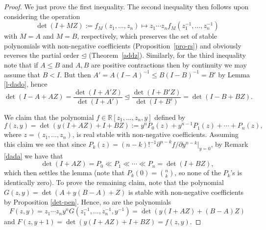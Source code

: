 \documentclass[10pt,reqno]{amsart}
\theoremstyle{plain}
\newtheorem{lemma}[theorem]{Lemma}
\theoremstyle{definition}
\theoremstyle{remark}
\newcommand{\RR}{\mathbb{R}}
\begin{document}
\begin{proof}
We just prove the first inequality. The second inequality then follows upon 
considering the operation 
$$\det(I+MZ):=f_M(z_1, \ldots, z_n) \mapsto 
z_1\cdots z_nf_M(z_1^{-1},\ldots, z_n^{-1})$$  
with $M=A$ and $M=B$, respectively, which preserves the set of stable 
polynomials with non-negative coefficients 
(Proposition~\ref{pro-rs}) and obviously reverses the partial order $\unlhd$
(Theorem~\ref{addz}).
Similarly, for the third inequality note that if $A \leq B$ and $A,B$ are 
positive contractions then 
by continuity we may assume that $B<I$. But then  
$A'=A(I-A)^{-1} \leq B(I-B)^{-1}=B'$ by Lemma \ref{l-dado}, hence
$$
\det(I-A+AZ)= \frac {\det(I+A'Z)}{\det(I+A')} \unlhd 
\frac{\det(I+B'Z)}{\det(I+B')}=\det(I-B+BZ). 
$$

We claim that the polynomial  $f \in \RR[z_1,\ldots, z_n,y]$ defined by 
$$f(z,y)=\det(y(I+AZ)+I+BZ):=y^nP_0(z)+ y^{n-1}P_1(z)+\cdots + P_n(z),$$ 
where $z=(z_1,\ldots,z_n)$, is real stable with non-negative coefficients. 
Assuming this claim we see that 
since $P_k(z)= (n-k)!^{-1}\partial^{n-k}f/\partial y^{n-k}\big|_{y=0}$,  
by Remark \ref{dada} we have that 
$$
\det(I+AZ)=P_0 \ll P_1 \ll \cdots \ll P_n=\det(I+BZ), 
$$ 
which then settles the lemma (note that $P_k(0)=\binom n k$, so none of the 
$P_k$'s is identically zero). To prove the remaining claim, note that the 
polynomial 
$
G(z,y)= \det(A+y(B-A)+Z)
$
is stable with non-negative coefficients by Proposition \ref{det-pen}. 
Hence, so are the polynomials 
$$
F(z,y)= z_1\cdots z_ny^nG(z_1^{-1},\ldots, z_n^{-1},y^{-1})
=\det(y(I+AZ)+(B-A)Z) 
$$
and $F(z,y+1)=\det(y(I+AZ)+I+BZ)=f(z,y)$. 
\end{proof}

\end{document}
